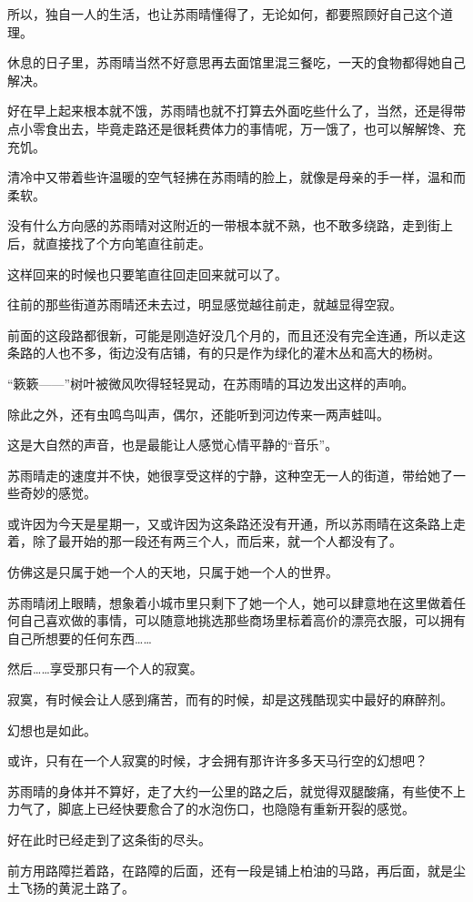 所以，独自一人的生活，也让苏雨晴懂得了，无论如何，都要照顾好自己这个道理。

休息的日子里，苏雨晴当然不好意思再去面馆里混三餐吃，一天的食物都得她自己解决。

好在早上起来根本就不饿，苏雨晴也就不打算去外面吃些什么了，当然，还是得带点小零食出去，毕竟走路还是很耗费体力的事情呢，万一饿了，也可以解解馋、充充饥。

清冷中又带着些许温暖的空气轻拂在苏雨晴的脸上，就像是母亲的手一样，温和而柔软。

没有什么方向感的苏雨晴对这附近的一带根本就不熟，也不敢多绕路，走到街上后，就直接找了个方向笔直往前走。

这样回来的时候也只要笔直往回走回来就可以了。

往前的那些街道苏雨晴还未去过，明显感觉越往前走，就越显得空寂。

前面的这段路都很新，可能是刚造好没几个月的，而且还没有完全连通，所以走这条路的人也不多，街边没有店铺，有的只是作为绿化的灌木丛和高大的杨树。

“簌簌——”树叶被微风吹得轻轻晃动，在苏雨晴的耳边发出这样的声响。

除此之外，还有虫鸣鸟叫声，偶尔，还能听到河边传来一两声蛙叫。

这是大自然的声音，也是最能让人感觉心情平静的“音乐”。

苏雨晴走的速度并不快，她很享受这样的宁静，这种空无一人的街道，带给她了一些奇妙的感觉。

或许因为今天是星期一，又或许因为这条路还没有开通，所以苏雨晴在这条路上走着，除了最开始的那一段还有两三个人，而后来，就一个人都没有了。

仿佛这是只属于她一个人的天地，只属于她一个人的世界。

苏雨晴闭上眼睛，想象着小城市里只剩下了她一个人，她可以肆意地在这里做着任何自己喜欢做的事情，可以随意地挑选那些商场里标着高价的漂亮衣服，可以拥有自己所想要的任何东西……

然后……享受那只有一个人的寂寞。

寂寞，有时候会让人感到痛苦，而有的时候，却是这残酷现实中最好的麻醉剂。

幻想也是如此。

或许，只有在一个人寂寞的时候，才会拥有那许许多多天马行空的幻想吧？

苏雨晴的身体并不算好，走了大约一公里的路之后，就觉得双腿酸痛，有些使不上力气了，脚底上已经快要愈合了的水泡伤口，也隐隐有重新开裂的感觉。

好在此时已经走到了这条街的尽头。

前方用路障拦着路，在路障的后面，还有一段是铺上柏油的马路，再后面，就是尘土飞扬的黄泥土路了。

